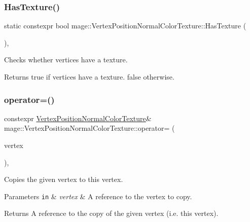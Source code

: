 \subsubsection{\texorpdfstring{Has\+Texture()}{HasTexture()}}
{\footnotesize\ttfamily static constexpr bool mage\+::\+Vertex\+Position\+Normal\+Color\+Texture\+::\+Has\+Texture (\begin{DoxyParamCaption}{ }\end{DoxyParamCaption})\hspace{0.3cm}{\ttfamily [static]}, {\ttfamily [noexcept]}}

Checks whether vertices have a texture.

\begin{DoxyReturn}{Returns}
{\ttfamily true} if vertices have a texture. {\ttfamily false} otherwise. 
\end{DoxyReturn}
\hypertarget{structmage_1_1_vertex_position_normal_color_texture_a97ad96dc018b200c1fd0c86586ddd5fc}{}\label{structmage_1_1_vertex_position_normal_color_texture_a97ad96dc018b200c1fd0c86586ddd5fc} 
\subsubsection{\texorpdfstring{operator=()}{operator=()}\hspace{0.1cm}{\footnotesize\ttfamily [1/2]}}
{\footnotesize\ttfamily constexpr \hyperlink{structmage_1_1_vertex_position_normal_color_texture}{Vertex\+Position\+Normal\+Color\+Texture}\& mage\+::\+Vertex\+Position\+Normal\+Color\+Texture\+::operator= (\begin{DoxyParamCaption}\item[{const \hyperlink{structmage_1_1_vertex_position_normal_color_texture}{Vertex\+Position\+Normal\+Color\+Texture} \&}]{vertex }\end{DoxyParamCaption})\hspace{0.3cm}{\ttfamily [default]}, {\ttfamily [noexcept]}}

Copies the given vertex to this vertex.


\begin{DoxyParams}[1]{Parameters}
\mbox{\tt in}  & {\em vertex} & A reference to the vertex to copy. \\
\hline
\end{DoxyParams}
\begin{DoxyReturn}{Returns}
A reference to the copy of the given vertex (i.\+e. this vertex). 
\end{DoxyReturn}
\hypertarget{structmage_1_1_vertex_position_normal_color_texture_a495b54b0ea751f40d53abc2ffc336557}{}\label{structmage_1_1_vertex_position_normal_color_texture_a495b54b0ea751f40d53abc2ffc336557} 
